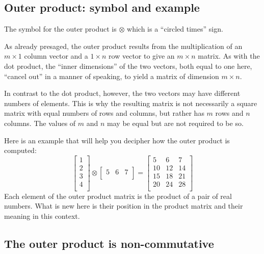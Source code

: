 \documentclass[
  a4paper,
]{article}
\begin{document}
\hypertarget{outer-product-symbol-and-example}{%
\subsection{Outer product: symbol and
example}\label{outer-product-symbol-and-example}}

The symbol for the outer product is \(\otimes\) which is a ``circled
times'' sign.

As already presaged, the outer product results from the multiplication
of an \(m \times 1\) column vector and a \(1 \times n\) row vector to
give an \(m \times n\) matrix. As with the dot product, the ``inner
dimensions'' of the two vectors, both equal to one here, ``cancel out''
in a manner of speaking, to yield a matrix of dimension \(m \times n\).

In contrast to the dot product, however, the two vectors may have
different numbers of elements. This is why the resulting matrix is not
necessarily a square matrix with equal numbers of rows and columns, but
rather has \(m\) rows and \(n\) columns. The values of \(m\) and \(n\)
may be equal but are not required to be so.

Here is an example that will help you decipher how the outer product is
computed: \[
\begin{bmatrix}
1\\2\\3\\4\\
\end{bmatrix}
\otimes
\begin{bmatrix}
5 & 6 & 7\\
\end{bmatrix}
= %
\begin{bmatrix}
5 & 6 & 7\\
10 & 12 & 14\\
15 & 18 & 21\\
20 & 24 & 28\\
\end{bmatrix}
\] Each element of the outer product matrix is the product of a pair of
real numbers. What is new here is their position in the product matrix
and their meaning in this context.

\hypertarget{the-outer-product-is-non-commutative}{%
\subsection{The outer product is
non-commutative}\label{the-outer-product-is-non-commutative}}
\end{document}
